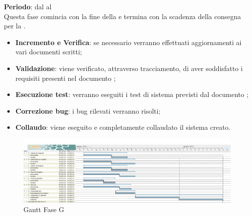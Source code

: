 	\textbf{Periodo}: dal  al  \\Questa fase comincia con la fine della  e termina con la scadenza della consegna per la .
	\begin{itemize}
		\item \textbf{Incremento e Verifica}: se necessario verranno effettuati aggiornamenti ai vari documenti scritti;
		\item \textbf{Validazione}: viene verificato, attraverso tracciamento, di aver soddisfatto i requisiti presenti nel documento ;
		\item \textbf{Esecuzione test}: verranno eseguiti i test di sistema previsti dal documento ;
		\item \textbf{Correzione bug}: i bug rilevati verranno risolti;
		\item \textbf{Collaudo}: viene eseguito e completamente collaudato il sistema creato.
	\end{itemize}
		\begin{figure}[H]\centering
			\includegraphics[width=\textwidth]{PianoDiProgetto/Pics/FaseG.png}
		\caption{Gantt Fase G}
\end{figure}
